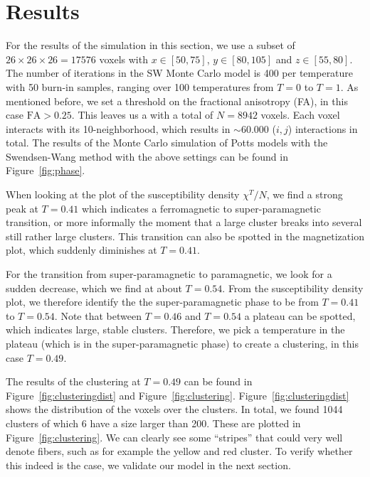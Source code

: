 \documentclass{article} %
\begin{document}
\section{Results} 
For the results of the simulation in this section, we use a subset of $26 \times 26 \times 26 = 17576$ voxels with $x \in [50,75]$, $y \in [80,105]$ and $z \in [55,80]$. The number of iterations in the SW Monte Carlo model is 400 per temperature with 50 burn-in samples, ranging over 100 temperatures from $T = 0$ to $T = 1$. As mentioned before, we set a threshold on the fractional anisotropy (FA), in this case $\text{FA} > 0.25$. This leaves us a with a total of $N = 8942$ voxels. Each voxel interacts with its 10-neighborhood, which results in $\sim 60.000$ ($i,j$) interactions in total. The results of the Monte Carlo simulation of Potts models with the Swendsen-Wang method with the above settings can be found in Figure~\ref{fig:phase}.

When looking at the plot of the susceptibility density $\chi^T/N$, we find a strong peak at $T = 0.41$ which indicates a ferromagnetic to super-paramagnetic transition, or more informally the moment that a large cluster breaks into several still rather large clusters. This transition can also be spotted in the magnetization plot, which suddenly diminishes at $T = 0.41$.

For the transition from super-paramagnetic to paramagnetic, we look for a sudden decrease, which we find at about $T = 0.54$. From the susceptibility density plot, we therefore identify the the super-paramagnetic phase to be from $T = 0.41$ to $T = 0.54$. Note that between $T = 0.46$ and $T = 0.54$ a plateau can be spotted, which indicates large, stable clusters. Therefore, we pick a temperature in the plateau (which is in the super-paramagnetic phase) to create a clustering, in this case $T = 0.49$.

The results of the clustering at $T = 0.49$ can be found in Figure~\ref{fig:clusteringdist} and Figure~\ref{fig:clustering}. Figure~\ref{fig:clusteringdist} shows the distribution of the voxels over the clusters. In total, we found 1044 clusters of which 6 have a size larger than 200. These are plotted in Figure~\ref{fig:clustering}. We can clearly see some ``stripes'' that could very well denote fibers, such as for example the yellow and red cluster. To verify whether this indeed is the case, we validate our model in the next section.
\end{document}
